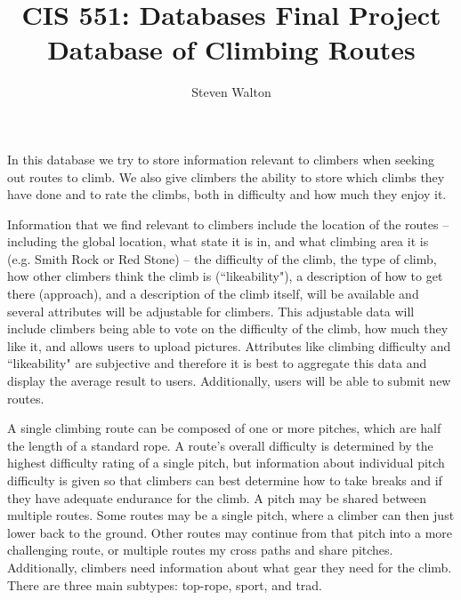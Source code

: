 \documentclass[12pt,letter]{article}
\begin{document}
\title{CIS 551: Databases Final Project\\
\large Database of Climbing Routes}
\author{Steven Walton}
\maketitle
In this database we try to store information relevant to climbers when seeking
out routes to climb. We also give climbers the ability to store which climbs
they have done and to rate the climbs, both in difficulty and how much they
enjoy it. 

Information that we find relevant to climbers include the location of the routes
-- including the global location, what state it is in, and what climbing area it
is (e.g. Smith Rock or Red Stone) -- the difficulty of the climb, the type of
climb, how other climbers think the climb is (``likeability"), a description of
how to get there (approach), and a description of the climb itself, will be
available and several attributes will be adjustable for climbers. This
adjustable data will include climbers being able to vote on the difficulty of
the climb, how much they like it, and allows users to upload pictures.
Attributes like climbing difficulty and ``likeability" are subjective and
therefore it is best to aggregate this data and display the average result to
users. Additionally, users will be able to submit new routes.

A single climbing route can be composed of one or more pitches, which are half
the length of a standard rope. A route's overall difficulty is determined by the
highest difficulty rating of a single pitch, but information about individual
pitch difficulty is given so that climbers can best determine how to take breaks
and if they have adequate endurance for the climb. A pitch may be shared between
multiple routes. Some routes may be a single pitch, where a climber can then
just lower back to the ground. Other routes may continue from that pitch into a
more challenging route, or multiple routes my cross paths and share pitches.
Additionally, climbers need information about what gear they need for the climb.
There are three main subtypes: top-rope, sport, and trad. 
\end{document}
